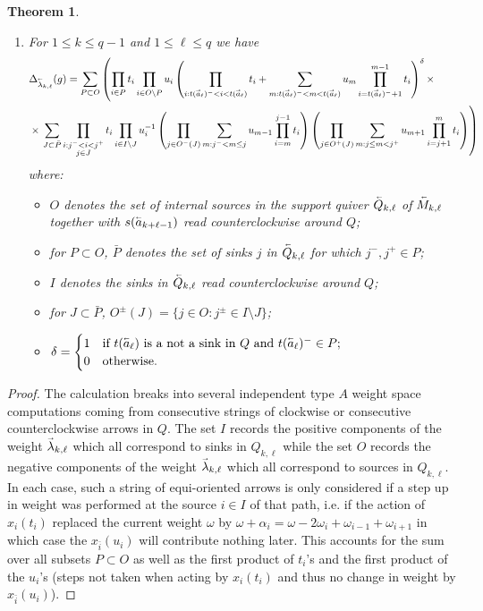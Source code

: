 \documentclass[11pt]{amsart}
\renewcommand{\vec}[1]{\accentset{\shortrightarrow}{#1}}
\newcommand{\cev}[1]{\accentset{\shortleftarrow}{#1}}
\newtheorem{theorem}{Theorem}[section]
\numberwithin{equation}{section}
\begin{document}
{\begin{theorem}
\begin{enumerate}
      \item For $1\le k\le q-1$ and $1\le\ell\le q$  we have
      \begin{align}
        &\Delta_{\cev{\lambda}_{k,\ell}}(g)=\sum_{P\subset O}\left(\prod_{i\in P} t_i\prod_{i\in O\setminus P} u_i\left(\prod_{i:t(\vec{a}_\ell)^-<i<t(\vec{a}_\ell)}t_i+\sum_{m:t(\vec{a}_\ell)^-<m<t(\vec{a}_\ell)}u_m\prod_{i=t(\vec{a}_\ell)^-+1}^{m-1} t_i\right)^\delta\times\right.\\
        \nonumber&\times\left.\sum_{J\subset\bar{P}}\prod_{\substack{i:j^-<i<j^+\\j\in J}}t_i\prod_{i\in I\setminus J}u_i^{-1}\left(\prod_{j\in O^-(J)}\sum_{m:j^-<m\le j}u_{m-1}\prod_{i=m}^{j-1} t_i\right)\left(\prod_{j\in O^+(J)}\sum_{m:j\le m<j^+}u_{m+1}\prod_{i=j+1}^{m} t_i\right)\right)
      \end{align}
      where:
      \begin{itemize}
        \item $O$ denotes the set of internal sources in the support quiver $\cev{Q}_{k,\ell}$ of $\cev{M}_{k,\ell}$ together with $s(\cev{a}_{k+\ell-1})$ read counterclockwise around $Q$;
        \item for $P\subset O$, $\bar{P}$ denotes the set of sinks $j$ in $\cev{Q}_{k,\ell}$ for which $j^-,j^+\in P$;
        \item $I$ denotes the sinks in $\cev{Q}_{k,\ell}$ read counterclockwise around $Q$;
        \item for $J\subset\bar{P}$, $O^\pm(J)=\{j\in O:j^\pm\in I\setminus J\}$;
        \item $\delta=\begin{cases}1 & \text{if $t(\cev{a}_\ell)$ is a not a sink in $Q$ and $t(\cev{a}_\ell)^-\in P$;}\\0 & \text{otherwise.}\end{cases}$
      \end{itemize}
    \end{enumerate}
  \end{theorem}
  \begin{proof}
    The calculation breaks into several independent type $A$ weight space computations coming from consecutive strings of clockwise or consecutive counterclockwise arrows in $Q$.  The set $I$ records the positive components of the weight $\vec{\lambda}_{k,\ell}$ which all correspond to sinks in $Q_{k,\ell}$ while the set $O$ records the negative components of the weight $\vec{\lambda}_{k,\ell}$ which all correspond to sources in $Q_{k,\ell}$.  In each case, such a string of equi-oriented arrows is only considered if a step up in weight was performed at the source $i\in I$ of that path, i.e. if the action of $x_i(t_i)$ replaced the current weight $\omega$ by $\omega+\alpha_i=\omega-2\omega_i+\omega_{i-1}+\omega_{i+1}$ in which case the $x_{\bar{i}}(u_i)$ will contribute nothing later.  This accounts for the sum over all subsets $P\subset O$ as well as the first product of $t_i$'s and the first product of the $u_i$'s (steps not taken when acting by $x_i(t_i)$ and thus no change in weight by $x_{\bar{i}}(u_i)$).


\end{proof}}
\end{document}
